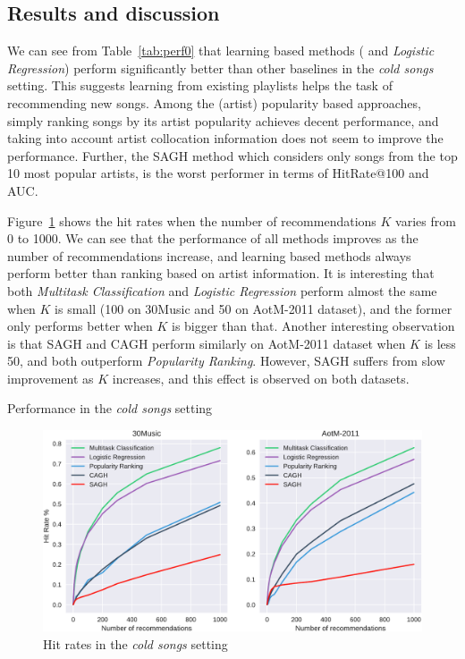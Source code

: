 \subsection{Results and discussion}

We can see from Table~\ref{tab:perf0} that learning based methods (
and {\it Logistic Regression}) perform significantly better than other baselines in the \emph{cold songs} setting.
This suggests learning from existing playlists helps the task of recommending new songs.
Among the (artist) popularity based approaches, 
simply ranking songs by its artist popularity achieves decent performance,
and taking into account artist collocation information does not seem to improve the performance.
Further, the SAGH method which considers only songs from the top 10 most popular artists,
is the worst performer in terms of HitRate@100 and AUC.

Figure~\ref{fig:hr0} shows the hit rates when the number of recommendations $K$ varies from 0 to 1000.
We can see that the performance of all methods improves as the number of recommendations increase,
and learning based methods always perform better than ranking based on artist information.
It is interesting that both {\it Multitask Classification} and {\it Logistic Regression} perform 
almost the same when $K$ is small (100 on 30Music and 50 on AotM-2011 dataset), 
and the former only performs better when $K$ is bigger than that.
Another interesting observation is that SAGH and CAGH perform similarly on AotM-2011 dataset when $K$
is less 50, and both outperform {\it Popularity Ranking}. However, SAGH suffers from slow improvement
as $K$ increases, and this effect is observed on both datasets.


\begin{table}[b]
\centering
\caption{Performance in the \emph{cold songs} setting}
\label{tab:perf0}
\resizebox{\columnwidth}{!}{

}
\end{table}

\begin{figure}[b]
\centering
\includegraphics[width=.975\linewidth]{fig/hitrate0.pdf}
\caption{Hit rates in the \emph{cold songs} setting}
\label{fig:hr0}
\end{figure}


